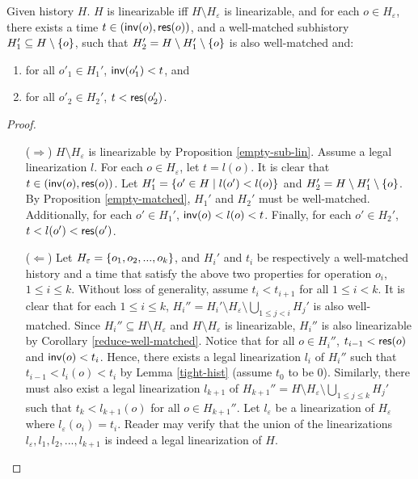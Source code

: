 \begin{lemma}\label{empty-reduce}
    Given history $H$. $H$ is linearizable iff $H\setminus H_\varepsilon$ is linearizable, and for each $o \in H_\varepsilon$, there exists a time $t \in ({\sf inv}(o), {\sf res}(o))$, and a well-matched subhistory $H_1' \subseteq H\setminus \{o\}$, such that $H_2' = H \setminus H_1'\setminus \{o\}$ is also well-matched and:
    \begin{enumerate}
        \item for all $o'_1 \in H_1'$, ${\sf inv}(o'_1) < t$, and
        \item for all $o'_2 \in H_2'$, $t < {\sf res}(o'_2)$.
    \end{enumerate}
\end{lemma}
\begin{proof}
    \begin{itemize}
        \item[($\Rightarrow$)] $H\setminus H_\varepsilon$ is linearizable by Proposition \ref{empty-sub-lin}. Assume a legal linearization $l$. For each $o \in H_\varepsilon$, let $t = l(o)$. It is clear that $t\in({\sf inv}(o), {\sf res}(o))$. Let $H_1' = \{o'\in H \;|\; l(o') < l(o)\}$ and $H_2' = H \setminus H_1'\setminus \{o\}$. By Proposition \ref{empty-matched}, $H_1'$ and $H_2'$ must be well-matched. Additionally, for each $o'\in H_1'$, ${\sf inv}(o) < l(o) < t$. Finally, for each $o' \in H_2'$, $t < l(o') < {\sf res}(o')$.

        \item[($\Leftarrow$)] Let $H_\varepsilon = \{o_1, o_2, ..., o_k\}$, and $H_i'$ and $t_i$ be respectively a well-matched history and a time that satisfy the above two properties for operation $o_i$, $1 \leq i \leq k$. Without loss of generality, assume $t_i < t_{i+1}$ for all $1 \leq i < k$. It is clear that for each $1 \leq i \leq k$, $H_i'' = H_i' \setminus H_\varepsilon \setminus \bigcup_{1\leq j<i}{H_j'}$ is also well-matched. Since $H_i'' \subseteq H \setminus H_\varepsilon$ and $H \setminus H_\varepsilon$ is linearizable, $H_i''$ is also linearizable by Corollary \ref{reduce-well-matched}. Notice that for all $o\in H_i''$, $t_{i-1} < {\sf res}(o)$ and ${\sf inv}(o) < t_i$. Hence, there exists a legal linearization $l_i$ of $H_i''$ such that $t_{i-1} < l_i(o) < t_i$ by Lemma \ref{tight-hist} (assume $t_0$ to be 0). Similarly, there must also exist a legal linearization $l_{k+1}$ of $H_{k+1}'' = H \setminus H_\varepsilon \setminus \bigcup_{1\leq j \leq k}{H_j'}$ such that $t_k < l_{k+1}(o)$ for all $o \in H_{k+1}''$. Let $l_\varepsilon$ be a linearization of $H_\varepsilon$ where $l_\varepsilon(o_i) = t_i$. Reader may verify that the union of the linearizations $l_\varepsilon, l_1, l_2, ..., l_{k+1}$ is indeed a legal linearization of $H$.
    \end{itemize}
\end{proof}


